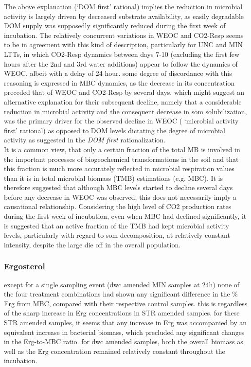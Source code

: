 \documentclass[12pt]{report}
\begin{document}
		The above explanation (‘DOM first’ rational) implies  the reduction in microbial activity is largely driven by decreased substrate availability, as easily degradable DOM supply was supposedly significantly reduced during the first week of incubation. The relatively concurrent variations in WEOC and CO2-Resp seems to be in agreement with this kind of description, particularly for UNC and MIN LTTs, in which CO2-Resp dynamics between days 7-10 (excluding the first few hours after the 2nd and 3rd water additions) appear to follow the dynamics of WEOC, albeit with a delay of 24 hour. some  degree of discordance with this reasoning is expressed in MBC dynamics, as the decrease in its concentration preceded that of WEOC and  CO2-Resp by several days, which might suggest an alternative explanation for their subsequent decline, namely that a considerable reduction in microbial activity and the consequent decrease in \gls{som} solubilization, was the primary driver for the observed decline in WEOC ( ‘microbial activity first’ rational) as opposed to DOM levels dictating the degree of microbial activity as suggested in the \textit{DOM first} rationalization.\\
		It is a common view, that only a certain fraction of the total MB  is involved in the important processes of biogeochemical transformations in the soil \citep{blagodatskaya2013, salazar-villegas2016} and that this fraction is much more accurately reflected in microbial respiration values than it is in total microbial biomass (TMB) estimations (e.g. MBC)\citep{salazar-villegas2016}. It is therefore suggested that although MBC levels started to decline several days before any decrease in WEOC was observed, this does not necessarily imply a causational relationship. Considering the high level of CO2 production rates during the first week of incubation, even when MBC had declined significantly, it is suggested that an active fraction of the TMB had kept microbial activity levels, particularly with regard to \gls{som} decomposition, at relatively constant intensity, despite the large die off in the overall population. \\
		
		
		\subsubsection{Ergosterol}
		
		except for a single sampling event (\gls{dwc} amended MIN samples at 24h) none of the four treatment combinations had shown any significant difference in the \% Erg from MBC, compared with their respective control samples. this is regardless of the sharp increase in Erg concentrations in STR amended samples. for these STR amended samples, it seems that any increase in Erg was accompanied by an equivalent increase in bacterial biomass, which precluded any significant changes in the Erg-to-MBC ratio. for \gls{dwc} amended samples, both the overall biomass as well as the Erg concentration remained relatively constant throughout the incubation. \\
		
\end{document}
